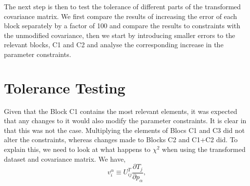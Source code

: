 \documentclass[twocolumn]{\docclass}
\newcommand\be{\begin{equation}}
\newcommand\ee{\end{equation}}
\begin{document}
	
	
	The next step is then to test the tolerance of different parts of the transformed covariance matrix. We first compare the results of increasing the error of each block separately by a factor of 100 and compare the results to constraints with the unmodified covariance, then we start by introducing smaller errors to the relevant blocks, C1 and C2 and analyse the corresponding increase in the parameter constraints.
		\section{Tolerance Testing}
	
	Given that the Block C1 contains the most relevant elements, it was expected that any changes to it would also modify the parameter constraints. It is clear in 	 that this was not the case. Multiplying the elements of Blocs C1 and C3 did not alter the constraints, whereas changes made to Blocks C2 and C1+C2 did. To explain this, we need to look at what happens to $\chi^2$ when using the transformed dataset and covariance matrix. We have,
		\be
	v_i^\alpha \equiv U_{ij}^T \frac{\partial T_j}{\partial p_\alpha}
	,\ee
	
\end{document}
